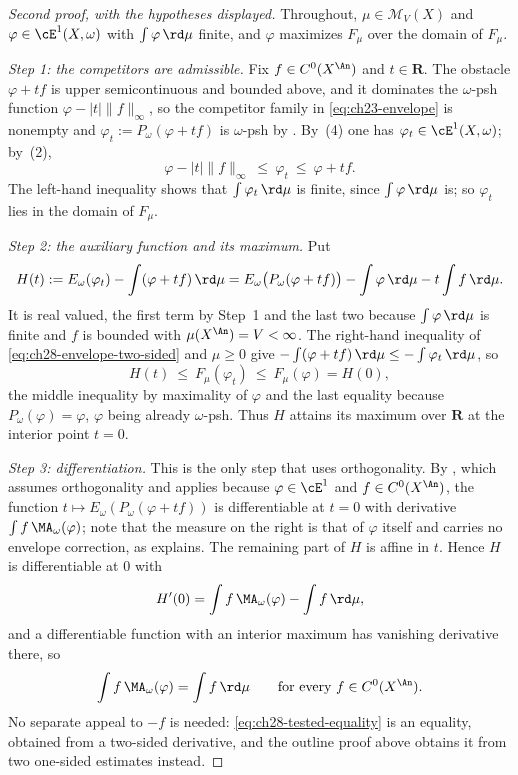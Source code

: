 \begin{proof}[Second proof, with the hypotheses displayed]
Throughout, $\mu\in\mathcal M_V(X)$ and
$\varphi\in\cE^1(X,\omega)$ with $\int\varphi\,\rd\mu$ finite, and
$\varphi$ maximizes $F_\mu$ over the domain of $F_\mu$.

\emph{Step 1: the competitors are admissible.}  Fix
$f\in C^0(X^{\An})$ and $t\in\mathbf R$.  The obstacle
$\varphi+tf$ is upper semicontinuous and bounded above, and it dominates
the $\omega$-psh function $\varphi-|t|\lVert f\rVert_\infty$, so the
competitor family in \eqref{eq:ch23-envelope} is nonempty and
$\varphi_t:=P_\omega(\varphi+tf)$ is $\omega$-psh by
.  By
\,(4) one has
$\varphi_t\in\cE^1(X,\omega)$; by
\,(2),
\begin{equation}
\label{eq:ch28-envelope-two-sided}
 \varphi-|t|\lVert f\rVert_\infty\ \leq\ \varphi_t\ \leq\ \varphi+tf .
\end{equation}
The left-hand inequality shows that $\int\varphi_t\,\rd\mu$ is finite,
since $\int\varphi\,\rd\mu$ is; so $\varphi_t$ lies in the domain of
$F_\mu$.

\emph{Step 2: the auxiliary function and its maximum.}  Put
\[
 H(t):=E_\omega(\varphi_t)-\int(\varphi+tf)\,\rd\mu
      =E_\omega\bigl(P_\omega(\varphi+tf)\bigr)
       -\int\varphi\,\rd\mu-t\int f\,\rd\mu .
\]
It is real valued, the first term by Step~1 and the last two because
$\int\varphi\,\rd\mu$ is finite and $f$ is bounded with
$\mu(X^{\An})=V<\infty$.  The right-hand inequality of
\eqref{eq:ch28-envelope-two-sided} and $\mu\geq0$ give
$-\int(\varphi+tf)\,\rd\mu\leq-\int\varphi_t\,\rd\mu$, so
\[
 H(t)\ \leq\ F_\mu(\varphi_t)\ \leq\ F_\mu(\varphi)=H(0),
\]
the middle inequality by maximality of $\varphi$ and the last equality
because $P_\omega(\varphi)=\varphi$, $\varphi$ being already
$\omega$-psh.  Thus $H$ attains its maximum over $\mathbf R$ at the
interior point $t=0$.

\emph{Step 3: differentiation.}  This is the only step that uses
orthogonality.  By , which assumes
orthogonality and applies because $\varphi\in\cE^1$ and
$f\in C^0(X^{\An})$, the function
$t\mapsto E_\omega(P_\omega(\varphi+tf))$ is differentiable at $t=0$
with derivative $\int f\,\MA_\omega(\varphi)$; note that the measure on the
right is that of $\varphi$ itself and carries no envelope correction, as
 explains.  The remaining part of $H$
is affine in $t$.  Hence $H$ is differentiable at $0$ with
\[
 H'(0)=\int f\,\MA_\omega(\varphi)-\int f\,\rd\mu ,
\]
and a differentiable function with an interior maximum has vanishing
derivative there, so
\begin{equation}
\label{eq:ch28-tested-equality}
 \int f\,\MA_\omega(\varphi)=\int f\,\rd\mu
 \qquad\text{for every }f\in C^0(X^{\An}).
\end{equation}
No separate appeal to $-f$ is needed: \eqref{eq:ch28-tested-equality} is
an equality, obtained from a two-sided derivative, and the outline proof
above obtains it from two one-sided estimates instead.


\end{proof}
